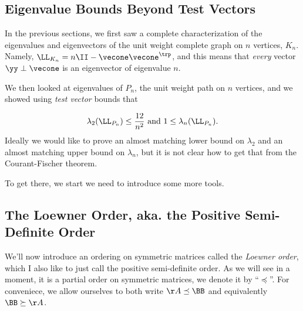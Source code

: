 
\subsection{Eigenvalue Bounds Beyond Test Vectors}

In the previous sections, we first saw a complete characterization of the
eigenvalues and eigenvectors of the unit weight complete graph on $n$
vertices, $K_n$. Namely, $\LL_{K_n} = n\II - \vecone \vecone^\trp$, and
this means that \emph{every} vector $\yy \perp \vecone$ is an
eigenvector of eigenvalue $n$.

We then looked at eigenvalues of $P_n$, the unit weight path on $n$
vertices, and we showed using \emph{test vector} bounds that

\begin{equation}
  \label{eq:testvectorbounds}
\lambda_2(\LL_{P_n}) \leq \frac{12}{n^2} \text{ and } 1 \leq
\lambda_n(\LL_{P_n}).
\end{equation}
%
Ideally we would like to prove an almost matching lower bound on
$\lambda_2$ and an almost matching upper bound on $\lambda_n$, but it
is not clear how to get that from the Courant-Fischer theorem.

To get there, we start we need to introduce some more tools.

\subsection{The Loewner Order, aka. the Positive Semi-Definite Order}
We'll now introduce an ordering on symmetric matrices called the
\emph{Loewner order}, which I also like to just call the positive
semi-definite order.
As we will see in a moment, it is a partial order on symmetric matrices, we denote
it by ``$\preceq$''.
For conveniece, we allow ourselves to both write  $\AA \preceq \BB$
and equivalently $\BB \succeq \AA$.

